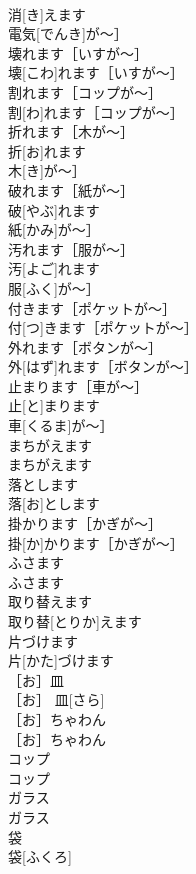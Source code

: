 \documentclass[8pt]{extreport}
\begin{document}
\begin{CJK}{UTF8}{min}
\\	消[き]えます
\\	電気[でんき]が〜］	
\\	壊れます［いすが〜］	
\\	壊[こわ]れます［いすが〜］	
\\	割れます［コップが〜］	
\\	割[わ]れます［コップが〜］	
\\	折れます［木が〜］	
\\	折[お]れます
\\	木[き]が〜］	
\\	破れます［紙が〜］	
\\	破[やぶ]れます
\\	紙[かみ]が〜］	
\\	汚れます［服が〜］	
\\	汚[よご]れます
\\	服[ふく]が〜］	
\\	付きます［ポケットが〜］	
\\	付[つ]きます［ポケットが〜］	
\\	外れます［ボタンが〜］	
\\	外[はず]れます［ボタンが〜］	
\\	止まります［車が〜］	
\\	止[と]まります
\\	車[くるま]が〜］	
\\	まちがえます	
\\	まちがえます	
\\	落とします	
\\	落[お]とします	
\\	掛かります［かぎが〜］	
\\	掛[か]かります［かぎが〜］	
\\	ふさます	
\\	ふさます	
\\	取り替えます	
\\	取り替[とりか]えます	
\\	片づけます	
\\	片[かた]づけます	
\\	［お］皿	
\\	［お］ 皿[さら]	
\\	［お］ちゃわん	
\\	［お］ちゃわん	
\\	コップ	
\\	コップ	
\\	ガラス	
\\	ガラス	
\\	袋	
\\	袋[ふくろ]	

\end{CJK}
\end{document}
